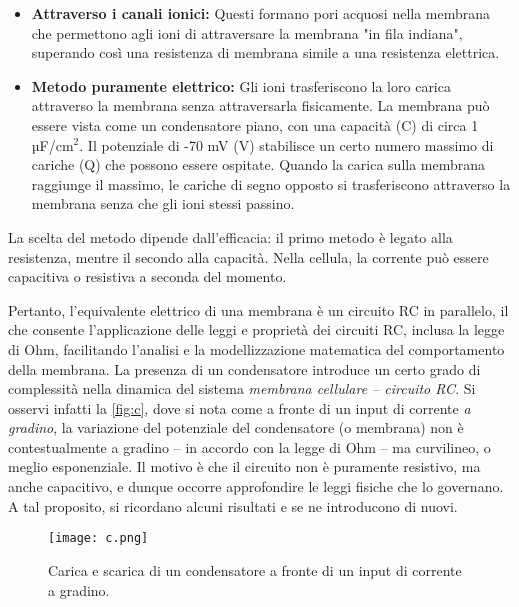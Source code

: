\begin{itemize}
    \item \textbf{Attraverso i canali ionici:} Questi formano pori acquosi nella membrana che permettono agli ioni di attraversare la membrana "in fila indiana", superando così una resistenza di membrana simile a una resistenza elettrica.
    
    \item \textbf{Metodo puramente elettrico:} Gli ioni trasferiscono la loro carica attraverso la membrana senza attraversarla fisicamente. La membrana può essere vista come un condensatore piano, con una capacità (C) di circa 1 µF/cm$^2$. Il potenziale di -70 mV (V) stabilisce un certo numero massimo di cariche (Q) che possono essere ospitate. Quando la carica sulla membrana raggiunge il massimo, le cariche di segno opposto si trasferiscono attraverso la membrana senza che gli ioni stessi passino.
\end{itemize}

La scelta del metodo dipende dall'efficacia: il primo metodo è legato alla resistenza, mentre il secondo alla capacità. Nella cellula, la corrente può essere capacitiva o resistiva a seconda del momento.

Pertanto, l’equivalente elettrico di una membrana è un circuito RC in parallelo, il che consente l'applicazione delle leggi e proprietà dei circuiti RC, inclusa la legge di Ohm, facilitando l'analisi e la modellizzazione matematica del comportamento della membrana. La presenza di un condensatore introduce un certo grado di complessità nella dinamica del sistema \textit{membrana cellulare -- circuito RC}. Si osservi infatti la \autoref{fig:c}, dove si nota come a fronte di un input di corrente \textit{a gradino}, la variazione del potenziale del condensatore (o membrana) non è contestualmente a gradino -- in accordo con la legge di Ohm -- ma curvilineo, o meglio esponenziale. Il motivo è che il circuito non è puramente resistivo, ma anche capacitivo, e dunque occorre approfondire le leggi fisiche che lo governano. A tal proposito, si ricordano alcuni risultati e se ne introducono di nuovi.

\begin{figure}[h]
    \centering
    \texttt{[image: c.png]}
    \caption{Carica e scarica di un condensatore a fronte di un input di corrente a gradino.}
    \label{fig:c}
\end{figure}

